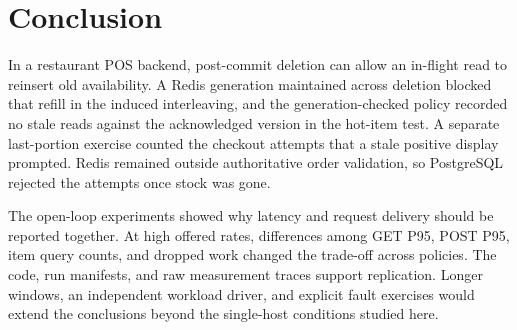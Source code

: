 \section{Conclusion}

In a restaurant POS backend, post-commit deletion can allow an in-flight read to reinsert old availability. A Redis generation maintained across deletion blocked that refill in the induced interleaving, and the generation-checked policy recorded no stale reads against the acknowledged version in the hot-item test. A separate last-portion exercise counted the checkout attempts that a stale positive display prompted. Redis remained outside authoritative order validation, so PostgreSQL rejected the attempts once stock was gone.

The open-loop experiments showed why latency and request delivery should be reported together. At high offered rates, differences among GET P95, POST P95, item query counts, and dropped work changed the trade-off across policies. The code, run manifests, and raw measurement traces support replication. Longer windows, an independent workload driver, and explicit fault exercises would extend the conclusions beyond the single-host conditions studied here.

